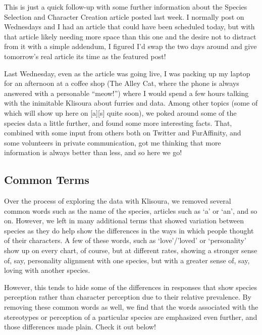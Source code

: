 
This is just a quick follow-up with some further information about the Species Selection and Character Creation article posted last week.  I normally post on Wednesdays and I had an article that could have been scheduled today, but with that article likely needing more space than this one and the desire not to distract from it with a simple addendum, I figured I'd swap the two days around and give tomorrow's real article its time as the featured post!

Last Wednesday, even as the article was going live, I was packing up my laptop for an afternoon at a coffee shop (The Alley Cat, where the phone is always answered with a personable ``meow!'') where I would spend a few hours talking with the inimitable Klisoura about furries and data.  Among other topics (some of which will show up here on [a][s] quite soon), we poked around some of the species data a little further, and found some more interesting facts.  That, combined with some input from others both on Twitter and FurAffinity, and some volunteers in private communication, got me thinking that more information is always better than less, and so here we go!

\subsection*{Common Terms}

Over the process of exploring the data with Klisoura, we removed several common words such as the name of the species, articles such as `a' or `an', and so on.  However, we left in many additional terms that showed variation between species as they do help show the differences in the ways in which people thought of their characters.  A few of these words, such as `love'/'loved' or `personality' show up on every chart, of course, but at different rates, showing a stronger sense of, say, personality alignment with one species, but with a greater sense of, say, loving with another species.

However, this tends to hide some of the differences in responses that show species perception rather than character perception due to their relative prevalence.  By removing these common words as well, we find that the words associated with the stereotypes or perception of a particular species are emphasized even further, and those differences made plain.  Check it out below!

